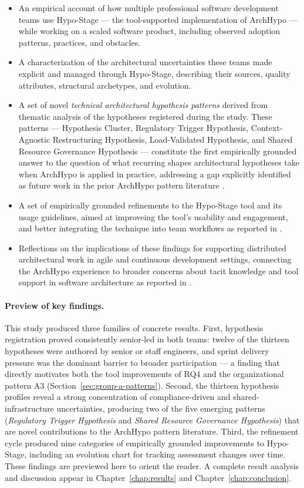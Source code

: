 \begin{itemize}
  \item An empirical account of how multiple professional software development teams use Hypo-Stage --- the tool-supported implementation of ArchHypo \citep{correa2025} --- while working on a scaled software product, including observed adoption patterns, practices, and obstacles.
  \item A characterization of the architectural uncertainties these teams made explicit and managed through Hypo-Stage, describing their sources, quality attributes, structural archetypes, and evolution.
  \item A set of novel \textit{technical architectural hypothesis patterns} derived from thematic analysis of the hypotheses registered during the study. These patterns --- Hypothesis Cluster, Regulatory Trigger Hypothesis, Context-Agnostic Restructuring Hypothesis, Load-Validated Hypothesis, and Shared Resource Governance Hypothesis --- constitute the first empirically grounded answer to the question of what recurring shapes architectural hypotheses take when ArchHypo is applied in practice, addressing a gap explicitly identified as future work in the prior ArchHypo pattern literature \citep{silva2024patterns}.
  \item A set of empirically grounded refinements to the Hypo-Stage tool and its usage guidelines, aimed at improveing the tool's usability and engagement, and better integrating the technique into team workflows as reported in \citet{correa2025}.
  \item Reflections on the implications of these findings for supporting distributed architectural work in agile and continuous development settings, connecting the ArchHypo experience to broader concerns about tacit knowledge and tool support in software architecture as reported in \citet{souza2019,infoq2024trends}.
\end{itemize}

\paragraph{Preview of key findings.}
This study produced three families of concrete results.
First, hypothesis registration proved consistently senior-led in both teams:
twelve of the thirteen hypotheses were authored by senior or staff engineers,
and sprint delivery pressure was the dominant barrier to broader participation ---
a finding that directly motivates both the tool improvements of RQ4 and the
organizational pattern A3 (Section~\ref{sec:group-a-patterns}).
Second, the thirteen hypothesis profiles reveal a strong concentration of
compliance-driven and shared-infrastructure uncertainties, producing two of
the five emerging patterns (\textit{Regulatory Trigger Hypothesis} and
\textit{Shared Resource Governance Hypothesis}) that are novel contributions
to the ArchHypo pattern literature.
Third, the refinement cycle produced nine categories of empirically grounded
improvements to Hypo-Stage, including an evolution chart for tracking
assessment changes over time. These findings are previewed here to orient the reader. A complete result analysis and
discussion appear in Chapter~\ref{chap:results} and Chapter~\ref{chap:conclusion}.

